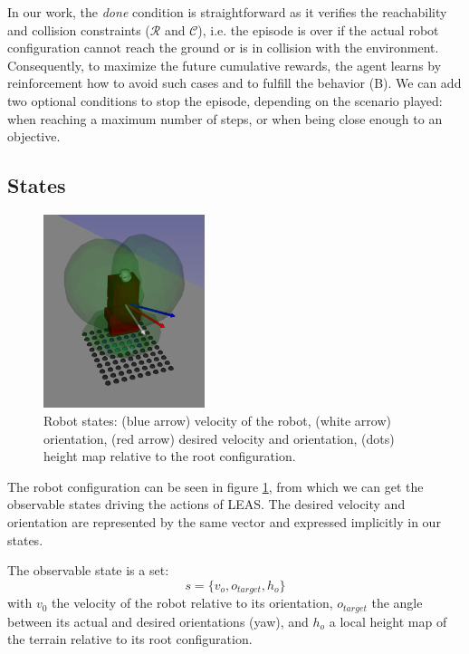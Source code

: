 In our work, the \textit{done} condition is straightforward as it verifies the reachability and collision constraints ($\mathcal{R}$ and $\mathcal{C}$), i.e. the episode is over if the actual robot configuration cannot reach the ground or is in collision with the environment. 
Consequently, to maximize the future cumulative rewards, the agent learns by reinforcement how to avoid such cases and to fulfill the behavior (B). 
We can add two optional conditions to stop the episode, depending on the scenario played: when reaching a maximum number of steps, or when being close enough to an objective.





\subsection{States\label{subsubsec:states}}

\begin{figure}[ht]
    \centering
    \includegraphics[width=0.42\textwidth]{Figures/Chapter_LEAS/leas_states.png}
    \caption{Robot states: (blue arrow) velocity of the robot, (white arrow) orientation, (red arrow) desired velocity and orientation, (dots) height map relative to the root configuration.}
    \label{fig:LEAS_states}
\end{figure}

The robot configuration can be seen in figure \ref{fig:LEAS_states}, from which we can get the observable states driving the actions of LEAS. The desired velocity and orientation are represented by the same vector and expressed implicitly in our states.

The observable state is a set: 
\begin{equation}
s=\{v_{o}, o_{target}, h_{o}\}
\end{equation}
with $v_{0}$ the velocity of the robot relative to its orientation, $o_{target}$ the angle between its actual and desired orientations (yaw), and $h_{o}$ a local height map of the terrain relative to its root configuration.

